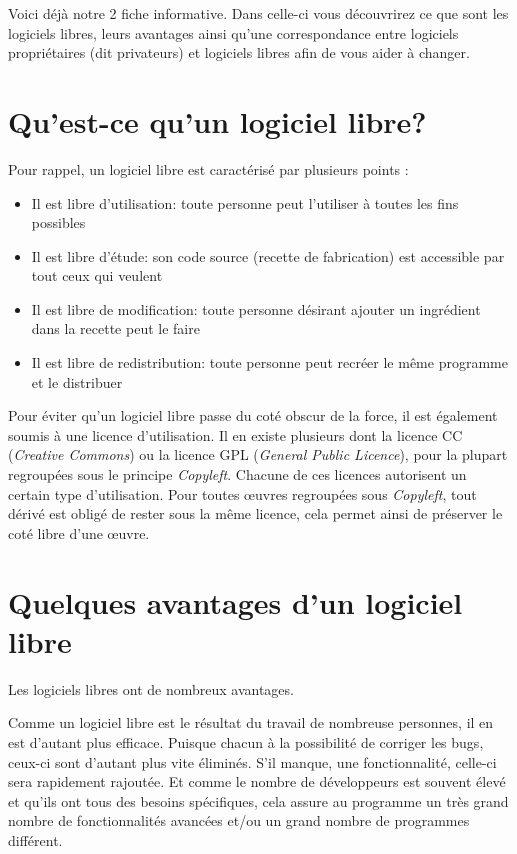 \documentclass[10pt]{../fiche}
\begin{document}

\vspace*{0.5cm}
Voici déjà notre 2 fiche informative. Dans celle-ci vous découvrirez ce que sont les logiciels libres, leurs avantages ainsi qu'une correspondance entre logiciels propriétaires (dit privateurs) et logiciels libres afin de vous aider à changer.

\section*{Qu'est-ce qu'un logiciel libre?}

Pour rappel, un logiciel libre est caractérisé par plusieurs points :
\begin{itemize}
\item Il est libre d'utilisation: toute personne peut l'utiliser à toutes les fins possibles
\item Il est libre d'étude: son code source (recette de fabrication) est accessible par tout ceux qui veulent
\item Il est libre de modification: toute personne désirant ajouter un ingrédient dans la recette peut le faire
\item Il est libre de redistribution: toute personne peut recréer le même programme et le distribuer
\end{itemize}

Pour éviter qu'un logiciel libre passe du coté obscur de la force, il est également soumis à une licence d'utilisation. Il en existe plusieurs dont la licence CC (\textit{Creative Commons}) ou la licence GPL (\textit{General Public Licence}), pour la plupart regroupées sous le principe \textit{Copyleft}. Chacune de ces licences autorisent un certain type d'utilisation. Pour toutes œuvres regroupées sous \textit{Copyleft}, tout dérivé est obligé de rester sous la même licence, cela permet ainsi de préserver le coté libre d'une œuvre.

\section*{Quelques avantages d'un logiciel libre}

Les logiciels libres ont de nombreux avantages.

Comme un logiciel libre est le résultat du travail de nombreuse personnes, il en est d'autant plus efficace. Puisque chacun à la possibilité de corriger les bugs, ceux-ci sont d'autant plus vite éliminés. S'il manque, une fonctionnalité, celle-ci sera rapidement rajoutée. Et comme le nombre de développeurs est souvent élevé et qu'ils ont tous des besoins spécifiques, cela assure au programme un très grand nombre de fonctionnalités avancées et/ou un grand nombre de programmes différent.
\end{document}
